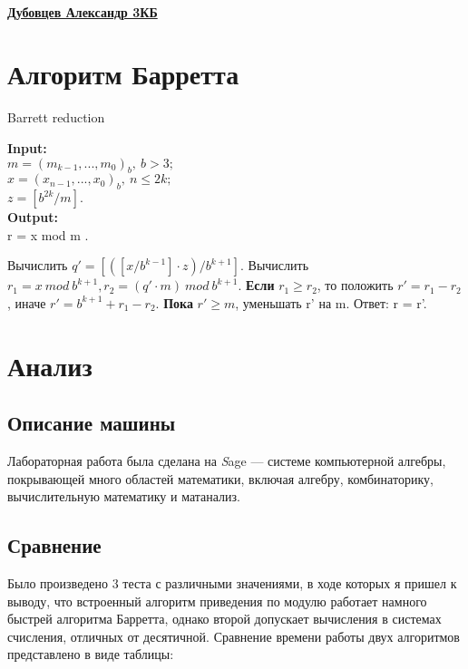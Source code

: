 \documentclass[11pt]{article}
\begin{document}
\linespread{1.3}


\begin{center}	
	\linespread{1.9}
	\vspace*{4mm}
	\\ {\bf \underline{Дубовцев Александр 3КБ}}
\end{center}
	

\section{Алгоритм Барретта }

\begin{algorithm}
	
	\caption{Barrett reduction}
	\label{alg:AlgName}
	\textbf{Input:}\\
	$m = (m_{k-1},...,m_{0})_{b},\: b > 3;$ \\
	$x = (x_{n-1},...,x_{0})_{b},\:n	\leq 2k;$ \\
	$z = [b^{2k}/m].$ \\
	\textbf{Output:}\\
	r = x mod m .
	
	\begin{algorithmic}[1]
		
		\State Вычислить $q' = [([x/b^{k-1}] \cdot z)/b^{k+1}]$. 
		\State Вычислить $r_{1} = x\:mod\:b^{k+1}, r_{2} = (q' \cdot m)\: mod\: b^{k+1} $.
		\State \textbf{Если} {$r_{1} \geq r_{2}$}, то положить $r'=r_{1}-r_{2}$, иначе $r'=b^{k+1}+r_{1}-r_{2} $.
		\State \textbf{Пока} $r' \geq m$, уменьшать r' на m.
		\State Ответ: r = r'.
		
	\end{algorithmic}

\end{algorithm}

\newpage

\section{Анализ}
\subsection{Описание машины}

Лабораторная работа была сделана на {\textit Sage} — системе компьютерной алгебры, покрывающей много областей математики, включая алгебру, комбинаторику, вычислительную математику и матанализ.

\subsection{Сравнение}
Было произведено 3 теста с различными значениями, в ходе которых я пришел к выводу, что встроенный алгоритм приведения по модулю работает намного быстрей алгоритма Барретта, однако второй допускает вычисления в системах счисления, отличных от десятичной. Сравнение времени работы двух алгоритмов представлено в виде таблицы: 
\\
\end{document}
